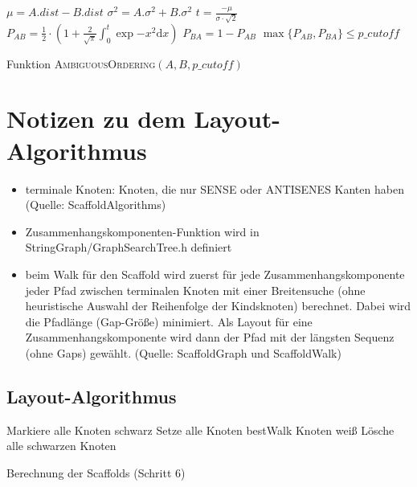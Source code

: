 \documentclass[a4paper,10pt,parskip]{scrartcl}
\begin{document}
\begin{algorithm}[H]
  $\mu = A.dist - B.dist$\;
  $\sigma^2 = A.\sigma^2 + B.\sigma^2$\;
  $t = \frac{-\mu}{\sigma\cdot\sqrt{2}}$\;
  $P_{AB} = \frac{1}{2} \cdot \left( 1 + \frac{2}{\sqrt{\pi}} \int_{0}^{t} \exp{-x^2}\mathrm dx\right)$\;
  $P_{BA} = 1 - P_{AB}$\;
  \Return $\max\{P_{AB}, P_{BA}\} \leq p\_cutoff$
  \caption{Funktion \textsc{AmbiguousOrdering}$(A, B, p\_cutoff)$}
\end{algorithm}

\section{Notizen zu dem Layout-Algorithmus}

\begin{itemize}
\item terminale Knoten: Knoten, die nur SENSE oder ANTISENES Kanten
  haben (Quelle: ScaffoldAlgorithms)
\item Zusammenhangskomponenten-Funktion wird in
  StringGraph/GraphSearchTree.h definiert
\item beim Walk für den Scaffold wird zuerst für jede
  Zusammenhangskomponente jeder Pfad zwischen terminalen Knoten mit
  einer Breitensuche (ohne heuristische Auswahl der Reihenfolge der
  Kindsknoten) berechnet. Dabei wird die Pfadlänge (Gap-Größe)
  minimiert. Als Layout für eine Zusammenhangskomponente wird dann
  der Pfad mit der längsten Sequenz (ohne Gaps) gewählt. (Quelle:
  ScaffoldGraph und ScaffoldWalk)
\end{itemize}

\subsection{Layout-Algorithmus}

\begin{algorithm}[H]
  \SetAlgoLined
  Markiere alle Knoten schwarz\;
  Setze alle Knoten bestWalk Knoten weiß\;
  Lösche alle schwarzen Knoten\;
  \caption{Berechnung der Scaffolds (Schritt 6)}
\end{algorithm}
\end{document}
